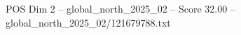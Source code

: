 \begin{textsample}{POS Dim 2 – global\_north\_2025\_02 – Score 32.00 – global\_north\_2025\_02/121679788.txt}
\end{textsample}
